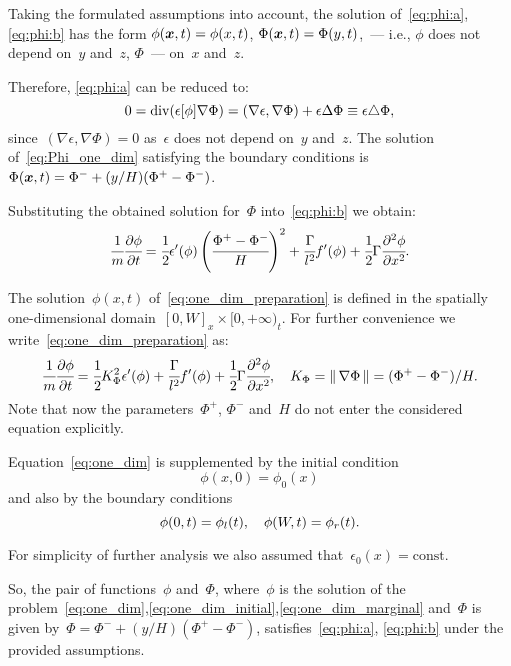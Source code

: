 Taking  the formulated assumptions into account,
the solution of~\eqref{eq:phi:a},\eqref{eq:phi:b} has the form
$\phi({\boldsymbol{x}}, t) = \phi(x, t)$, $\Phi({\boldsymbol{x}}, t) = \Phi(y, t)$,~---
i.e.,  $\phi$ does not depend on~$y$ and~$z$, $\Phi$~--- on~$x$ and~$z$.

Therefore, \eqref{eq:phi:a} can be reduced to:
\begin{equation}
  0 = \operatorname{{div}}(\epsilon[\phi] \nabla \Phi) = (\nabla \epsilon, \nabla \Phi) + \epsilon \Delta \Phi \equiv  \epsilon \triangle \Phi,
  \label{eq:Phi_one_dim}
\end{equation}
since~$(\nabla \epsilon, \nabla \Phi) = 0$ as~$\epsilon$ does not depend on~$y$ and~$z$.
The solution of~\eqref{eq:Phi_one_dim} satisfying the boundary conditions is~$\Phi({\boldsymbol{x}}, t) = \Phi^- + (y / H)(\Phi^+ - \Phi^-)$.

Substituting the obtained solution for~$\Phi$ into~\eqref{eq:phi:b} we obtain:
\begin{equation}
  \cfrac{1}{m} \cfrac{\partial \phi}{\partial t} = \cfrac{1}{2} \epsilon'(\phi) \left( \cfrac{\Phi^+ - \Phi^-}{H} \right)^2 + \cfrac{\Gamma}{l^2} f'(\phi) + \cfrac{1}{2} \Gamma \cfrac{\partial^2 \phi}{\partial x^2} {\text{.}}
  \label{eq:one_dim_preparation}
\end{equation}

The solution~$\phi(x, t)$ of~\eqref{eq:one_dim_preparation} is defined in
the spatially one-dimensional domain~$[0, W]_x \times [0, +\infty)_t$.
For further convenience we write~\eqref{eq:one_dim_preparation} as:
\begin{equation}
  \cfrac{1}{m} \cfrac{\partial \phi}{\partial t} = \cfrac{1}{2} K_\Phi^2 \epsilon'(\phi) + \cfrac{\Gamma}{l^2} f'(\phi) + \cfrac{1}{2} \Gamma \cfrac{\partial^2 \phi}{\partial x^2},\quad
  K_\Phi = \| \, \nabla \Phi \, \| = (\Phi^+ - \Phi^-) / H. 
  \label{eq:one_dim}
\end{equation}
Note that now the parameters~$\Phi^+$, $\Phi^-$ and~$H$ do not enter the considered equation explicitly.

Equation~\eqref{eq:one_dim} is supplemented by the initial condition
\begin{equation}
	\phi(x, 0) = \phi_0(x)
	\label{eq:one_dim_initial}
\end{equation}
and also by the boundary conditions
\begin{equation}
  \phi(0, t) = \phi_l(t), \quad \phi(W, t) = \phi_r(t) {\text{.}}
  \label{eq:one_dim_marginal}
\end{equation}

For simplicity of further analysis we also assumed that~$\epsilon_0(x) = \text{const}$.

So, the pair of functions~$\phi$ and~$\Phi$,
where~$\phi$ is the solution of the problem~\eqref{eq:one_dim},\eqref{eq:one_dim_initial},\eqref{eq:one_dim_marginal}
and~$\Phi$ is given by~$\Phi = \Phi^- + (y / H)(\Phi^+ - \Phi^-)$,
satisfies~\eqref{eq:phi:a}, \eqref{eq:phi:b} under the provided assumptions.

\endinput

